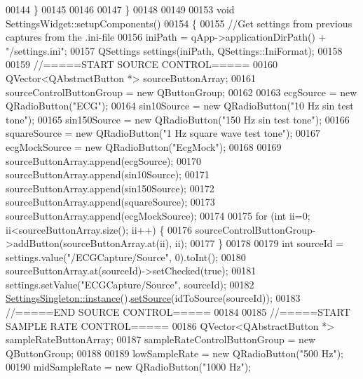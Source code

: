 \begin{DoxyCode}
00144     \}
00145 
00146 
00147 \}
00148 
00149 
00153 \textcolor{keywordtype}{void} SettingsWidget::setupComponents()
00154 \{
00155     \textcolor{comment}{//Get settings from previous captures from the .ini-file}
00156     iniPath = qApp->applicationDirPath() + \textcolor{stringliteral}{"/settings.ini"};
00157     QSettings settings(iniPath, QSettings::IniFormat);
00158 
00159     \textcolor{comment}{//=====START SOURCE CONTROL=====}
00160     QVector<QAbstractButton *> sourceButtonArray;
00161     sourceControlButtonGroup = \textcolor{keyword}{new} QButtonGroup;
00162 
00163     ecgSource = \textcolor{keyword}{new} QRadioButton(\textcolor{stringliteral}{"ECG"});
00164     sin10Source = \textcolor{keyword}{new} QRadioButton(\textcolor{stringliteral}{"10 Hz sin test tone"});
00165     sin150Source = \textcolor{keyword}{new} QRadioButton(\textcolor{stringliteral}{"150 Hz sin test tone"});
00166     squareSource = \textcolor{keyword}{new} QRadioButton(\textcolor{stringliteral}{"1 Hz square wave test tone"});
00167     ecgMockSource = \textcolor{keyword}{new} QRadioButton(\textcolor{stringliteral}{"EcgMock"});
00168 
00169     sourceButtonArray.append(ecgSource);
00170     sourceButtonArray.append(sin10Source);
00171     sourceButtonArray.append(sin150Source);
00172     sourceButtonArray.append(squareSource);
00173     sourceButtonArray.append(ecgMockSource);
00174 
00175     \textcolor{keywordflow}{for} (\textcolor{keywordtype}{int} ii=0; ii<sourceButtonArray.size(); ii++) \{
00176         sourceControlButtonGroup->addButton(sourceButtonArray.at(ii), ii);
00177     \}
00178 
00179     \textcolor{keywordtype}{int} sourceId = settings.value(\textcolor{stringliteral}{"/ECGCapture/Source"}, 0).toInt();
00180     sourceButtonArray.at(sourceId)->setChecked(\textcolor{keyword}{true});
00181     settings.setValue(\textcolor{stringliteral}{"ECGCapture/Source"}, sourceId);
00182     \hyperlink{classSettingsSingleton_aad528becd7ce5903c418a5b8b718074c}{SettingsSingleton::instance}().\hyperlink{classSettingsSingleton_af3d750e4f32db65df430d03a9b947b16}{setSource}(idToSource(sourceId));
00183     \textcolor{comment}{//=====END SOURCE CONTROL=====}
00184 
00185     \textcolor{comment}{//=====START SAMPLE RATE CONTROL=====}
00186     QVector<QAbstractButton *> sampleRateButtonArray;
00187     sampleRateControlButtonGroup = \textcolor{keyword}{new} QButtonGroup;
00188 
00189     lowSampleRate = \textcolor{keyword}{new} QRadioButton(\textcolor{stringliteral}{"500 Hz"});
00190     midSampleRate = \textcolor{keyword}{new} QRadioButton(\textcolor{stringliteral}{"1000 Hz"});

\end{DoxyCode}
